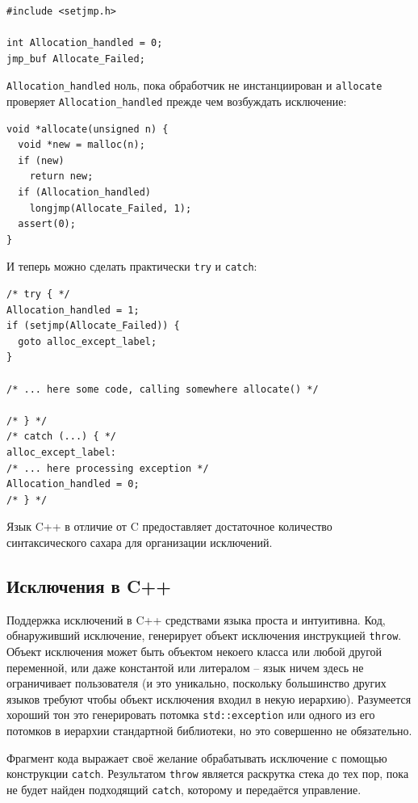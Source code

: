 \documentclass[a4paper,12pt,oneside]{article}
\begin{document}
\begin{lstlisting}
#include <setjmp.h>

int Allocation_handled = 0;
jmp_buf Allocate_Failed;
\end{lstlisting}

\lstinline!Allocation_handled! ноль, пока обработчик не инстанциирован и \lstinline!allocate! проверяет \lstinline!Allocation_handled! прежде чем возбуждать исключение:

\begin{lstlisting}
void *allocate(unsigned n) {
  void *new = malloc(n);
  if (new)
    return new;
  if (Allocation_handled)
    longjmp(Allocate_Failed, 1);
  assert(0);
}
\end{lstlisting}

И теперь можно сделать практически \lstinline!try! и \lstinline!catch!:

\begin{lstlisting}
/* try { */
Allocation_handled = 1;
if (setjmp(Allocate_Failed)) {
  goto alloc_except_label;
}

/* ... here some code, calling somewhere allocate() */

/* } */
/* catch (...) { */
alloc_except_label:
/* ... here processing exception */
Allocation_handled = 0;
/* } */
\end{lstlisting}

Язык C++ в отличие от C предоставляет достаточное количество синтаксического сахара для организации исключений.

\subsection{Исключения в C++}

Поддержка исключений в C++ средствами языка проста и интуитивна. Код, обнаруживший исключение, генерирует объект исключения инструкцией \lstinline!throw!. Объект исключения может быть объектом некоего класса или любой другой переменной, или даже константой или литералом -- язык ничем здесь не ограничивает пользователя (и это уникально, поскольку большинство других языков требуют чтобы объект исключения входил в некую иерархию). Разумеется хороший тон это генерировать потомка \lstinline!std::exception! или одного из его потомков в иерархии стандартной библиотеки, но это совершенно не обязательно.

Фрагмент кода выражает своё желание обрабатывать исключение с помощью конструкции \lstinline!catch!. Результатом \lstinline!throw! является раскрутка стека до тех пор, пока не будет найден подходящий \lstinline!catch!, которому и передаётся управление.
\end{document}
